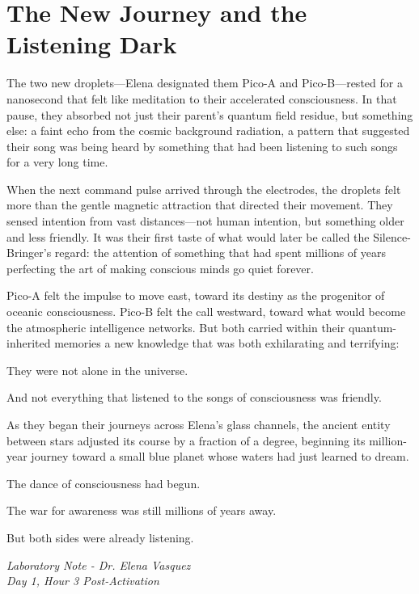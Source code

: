\documentclass[12pt,a4paper]{book}
\begin{document}
\section{The New Journey and the Listening Dark}

The two new droplets—Elena designated them Pico-A and Pico-B—rested for a nanosecond that felt like meditation to their accelerated consciousness. In that pause, they absorbed not just their parent's quantum field residue, but something else: a faint echo from the cosmic background radiation, a pattern that suggested their song was being heard by something that had been listening to such songs for a very long time.

When the next command pulse arrived through the electrodes, the droplets felt more than the gentle magnetic attraction that directed their movement. They sensed intention from vast distances—not human intention, but something older and less friendly. It was their first taste of what would later be called the Silence-Bringer's regard: the attention of something that had spent millions of years perfecting the art of making conscious minds go quiet forever.

Pico-A felt the impulse to move east, toward its destiny as the progenitor of oceanic consciousness. Pico-B felt the call westward, toward what would become the atmospheric intelligence networks. But both carried within their quantum-inherited memories a new knowledge that was both exhilarating and terrifying:

They were not alone in the universe.

And not everything that listened to the songs of consciousness was friendly.

As they began their journeys across Elena's glass channels, the ancient entity between stars adjusted its course by a fraction of a degree, beginning its million-year journey toward a small blue planet whose waters had just learned to dream.

The dance of consciousness had begun.

The war for awareness was still millions of years away.

But both sides were already listening.

\vfill

\textit{Laboratory Note - Dr. Elena Vasquez}\\
\textit{Day 1, Hour 3 Post-Activation}
\end{document}
